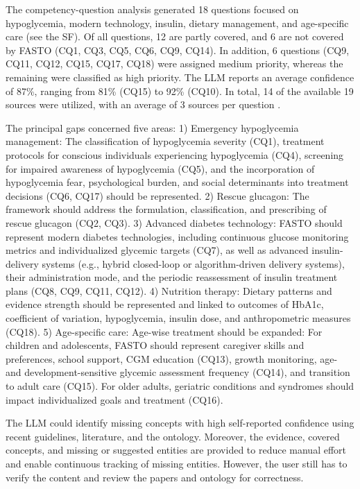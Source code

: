 \documentclass[
]{ceurart}
\begin{document}
The competency-question analysis generated 18 questions focused on hypoglycemia, modern technology, insulin, dietary management, and age-specific care (see the SF). Of all questions, 12 are partly covered, and 6 are not covered by FASTO (CQ1, CQ3, CQ5, CQ6, CQ9, CQ14). In addition, 6 questions (CQ9, CQ11, CQ12, CQ15, CQ17, CQ18) were assigned medium priority, whereas the remaining were classified as high priority. The LLM reports an average confidence of 87\%, ranging from 81\% (CQ15) to 92\% (CQ10). In total, 14 of the available 19 sources were utilized, with an average of 3 sources per question \cite{imporvingcare2025, glycemic2024, diabTech2025, Pharma2025, olderadults2025, children2025, Lundemose2025, Sherr2026, Talbo2026, Singh2024, Zeng2025}. 

The principal gaps concerned five areas: 1) Emergency hypoglycemia management: The classification of hypoglycemia severity (CQ1), treatment protocols for conscious individuals experiencing hypoglycemia (CQ4), screening for impaired awareness of hypoglycemia (CQ5), and the incorporation of hypoglycemia fear, psychological burden, and social determinants into treatment decisions (CQ6, CQ17) should be represented. 2) Rescue glucagon: The framework should address the formulation, classification, and prescribing of rescue glucagon (CQ2, CQ3). 3) Advanced diabetes technology: FASTO should represent modern diabetes technologies, including continuous glucose monitoring metrics and individualized glycemic targets (CQ7), as well as advanced insulin-delivery systems (e.g., hybrid closed-loop or algorithm-driven delivery systems), their administration mode, and the periodic reassessment of insulin treatment plans (CQ8, CQ9, CQ11, CQ12). 4) Nutrition therapy: Dietary patterns and evidence strength should be represented and linked to outcomes of HbA1c, coefficient of variation, hypoglycemia, insulin dose, and anthropometric measures (CQ18). 5) Age-specific care: Age-wise treatment should be expanded: For children and adolescents, FASTO should represent caregiver skills and preferences, school support, CGM education (CQ13), growth monitoring, age- and development-sensitive glycemic assessment frequency (CQ14), and transition to adult care (CQ15). For older adults, geriatric conditions and syndromes should impact individualized goals and treatment (CQ16).

The LLM could identify missing concepts with high self-reported confidence using recent guidelines, literature, and the ontology. Moreover, the evidence, covered concepts, and missing or suggested entities are provided to reduce manual effort and enable continuous tracking of missing entities. However, the user still has to verify the content and review the papers and ontology for correctness. 
\end{document}
